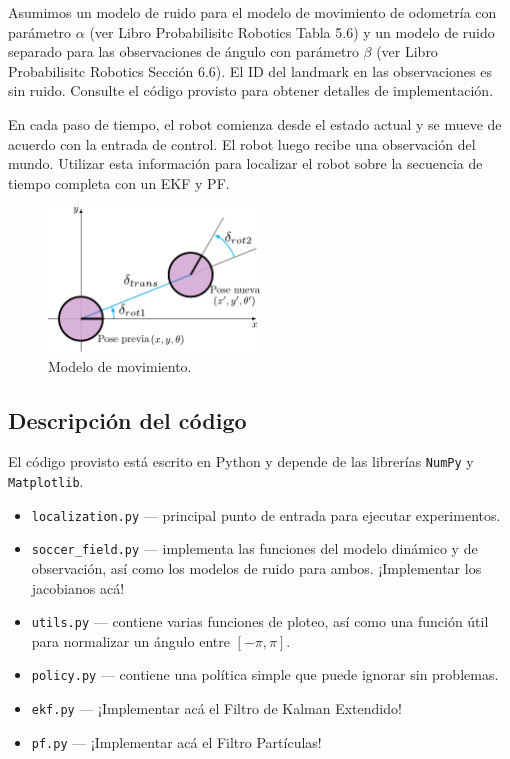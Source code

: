 \documentclass[tp]{lcc}
\begin{document}
	Asumimos un modelo de ruido para el modelo de movimiento de odometría con parámetro $\alpha$ (ver Libro Probabilisitc Robotics Tabla 5.6) y un modelo de ruido separado para las observaciones de ángulo con parámetro $\beta$ (ver Libro Probabilisitc Robotics Sección 6.6). El ID del landmark en las observaciones es sin ruido. Consulte el código provisto para obtener detalles de implementación.
	
	En cada paso de tiempo, el robot comienza desde el estado actual y se mueve de acuerdo con la entrada de control. El robot luego recibe una observación del mundo. Utilizar esta información para localizar el robot sobre la secuencia de tiempo completa con un EKF y PF.
	
	\begin{figure}[!htbp]
		\centering
		\includegraphics[width=0.5\textwidth]{./images/odometry_as_controls.pdf}
        \caption{Modelo de movimiento.}
		\label{fig:odometry-base-motion-model}
	\end{figure}

	\subsection{Descripción del código}
	
	El código provisto está escrito en Python y depende de las librerías \lstinline[style=bash]{NumPy} y \lstinline[style=bash]{Matplotlib}.
	
	\begin{itemize}
		\item \lstinline[style=bash]{localization.py} --- principal punto de entrada para ejecutar experimentos.
		\item \lstinline[style=bash]{soccer_field.py} --- implementa las funciones del modelo dinámico y de observación, así como los modelos de ruido para ambos. ¡Implementar los jacobianos acá!
		\item \lstinline[style=bash]{utils.py} --- contiene varias funciones de ploteo, así como una función útil para normalizar un ángulo entre $[-\pi, \pi]$.
		\item \lstinline[style=bash]{policy.py} --- contiene una política simple que puede ignorar sin problemas.
		\item \lstinline[style=bash]{ekf.py} --- ¡Implementar acá el Filtro de Kalman Extendido!
		\item \lstinline[style=bash]{pf.py} --- ¡Implementar acá el Filtro Partículas!
	\end{itemize}
\end{document}
